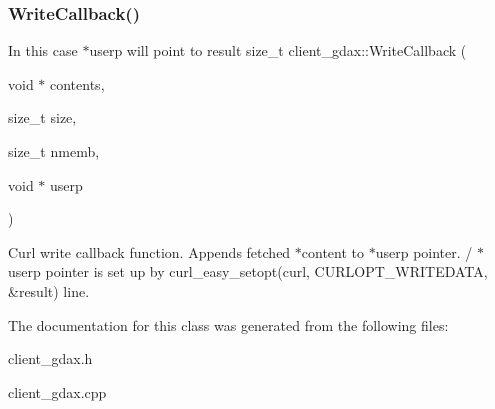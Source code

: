 \subsubsection{\texorpdfstring{Write\+Callback()}{WriteCallback()}}
{\footnotesize\ttfamily In this case $\ast$userp will point to result size\+\_\+t client\+\_\+gdax\+::\+Write\+Callback (\begin{DoxyParamCaption}\item[{void $\ast$}]{contents,  }\item[{size\+\_\+t}]{size,  }\item[{size\+\_\+t}]{nmemb,  }\item[{void $\ast$}]{userp }\end{DoxyParamCaption})\hspace{0.3cm}{\ttfamily [static]}}

Curl write callback function. Appends fetched $\ast$content to $\ast$userp pointer. / $\ast$userp pointer is set up by curl\+\_\+easy\+\_\+setopt(curl, C\+U\+R\+L\+O\+P\+T\+\_\+\+W\+R\+I\+T\+E\+D\+A\+T\+A, \&result) line. 

The documentation for this class was generated from the following files\+:\begin{DoxyCompactItemize}
\item 
client\+\_\+gdax.\+h\item 
client\+\_\+gdax.\+cpp\end{DoxyCompactItemize}

